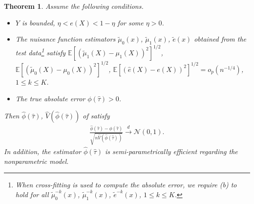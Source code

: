 \documentclass[twoside]{article}
\newtheorem{theorem}{Theorem}
\newcommand{\calN}{\mathcal{N}}
\newcommand{\1}{{\mathbbm{1}}}
\def\EE{\mathbb{E}}
\begin{document}
\begin{theorem}\label{theo:absolute.error}
    Assume the following conditions.
    \begin{itemize}
        \item [(a)] $Y$ is bounded, $\eta < e(X) < 1 - \eta$ for some $\eta > 0$.
        \item [(b)] The nuisance function estimators $\tilde{\mu}_{0}(x)$, $\tilde{\mu}_{1}(x)$, $\tilde{e}(x)$ obtained from the test data\footnote{When cross-fitting is used to compute the absolute error, we require (b) to hold for all $\tilde{\mu}_{0}^{-k}(x)$, $\tilde{\mu}_{1}^{-k}(x)$, $\tilde{e}^{-k}(x)$, $1 \le k \le K$.} satisfy $\EE[(\tilde{\mu}_{1}(X) - \mu_1(X))^2]^{1/2}$, $\EE[(\tilde{\mu}_{0}(X) - \mu_0(X))^2]^{1/2}$, $\EE[(\hat{e}(X) - e(X))^2]^{1/2} = o_p(n^{-1/4})$, $1 \le k \le K$. 
        \item [(c)] The true absolute error $\phi(\hat{\tau}) > 0$.
    \end{itemize}
    Then $\hat{\phi}(\hat{\tau})$, $\hat{V} (\hat{\phi}(\hat{\tau}))$ of  satisfy
    \begin{align*}
        \frac{\hat{\phi}(\hat{\tau}) - {\phi}(\hat{\tau})}{\sqrt{n\hat{V}(\hat{\phi}(\hat{\tau}))}}
        \stackrel{d}{\to} \calN(0,1).
    \end{align*}
    In addition, the estimator $\hat{\phi}(\hat{\tau})$ is semi-parametrically efficient regarding the nonparametric model.
\end{theorem}
\end{document}
